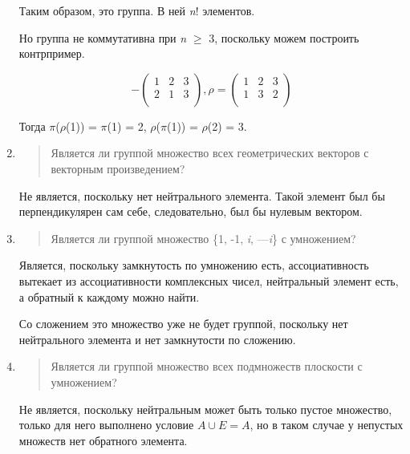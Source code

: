 \documentclass[12pt]{article}
\begin{document}
\begin{enumerate}
          Таким образом, это группа. В ней \emph{n}! элементов.

          Но группа не коммутативна при \emph{n} $\geq$ 3, поскольку можем построить
          контрпример.

          \[- \begin{pmatrix}
                  1 & 2 & 3 \\
                  2 & 1 & 3 \\
              \end{pmatrix},\rho = (\begin{matrix}
                  1 & 2 & 3 \\
                  1 & 3 & 2 \\
              \end{matrix})\]

          Тогда $\pi$($\rho$(1)) = $\pi$(1) = 2, $\rho$($\pi$(1)) = $\rho$(2) = 3.

    \item
          \begin{quote}
              Является ли группой множество всех геометрических векторов с векторным
              произведением?
          \end{quote}

          Не является, поскольку нет нейтрального элемента. Такой элемент был бы
          перпендикулярен сам себе, следовательно, был бы нулевым вектором.

    \item
          \begin{quote}
              Является ли группой множество \{1, -1, \emph{i}, ---\emph{i}\} с
              умножением?
          \end{quote}

          Является, поскольку замкнутость по умножению есть, ассоциативность
          вытекает из ассоциативности комплексных чисел, нейтральный элемент есть,
          а обратный к каждому можно найти.

          Со сложением это множество уже не будет группой, поскольку нет
          нейтрального элемента и нет замкнутости по сложению.

    \item
          \begin{quote}
              Является ли группой множество всех подмножеств плоскости с умножением?
          \end{quote}

          Не является, поскольку нейтральным может быть только пустое множество,
          только для него выполнено условие $A \cup E = A$, но в таком случае у
          непустых множеств нет обратного элемента.


\end{enumerate}
\end{document}
